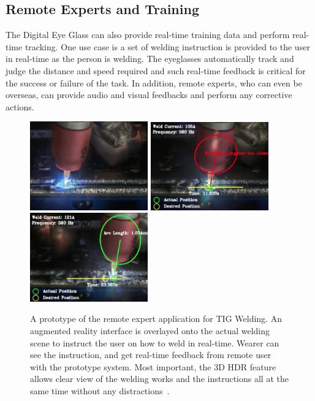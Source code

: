 \subsection{Remote Experts and Training}

The Digital Eye Glass can also provide real-time training data and perform real-time tracking. One 
use case is a set of welding instruction is provided to the user in real-time as the person is welding. 
The eyeglasses automatically track and judge the distance and speed required and such real-time 
feedback is critical for the success or failure of the task. In addition, remote experts, who can even be 
overseas, can provide audio and visual feedbacks and perform any corrective actions. 

\begin{figure}
\center
 \includegraphics[width=2in]{ch2/diagrams/remote1.jpg}
 \includegraphics[width=2in]{ch2/diagrams/remote3.jpg}
 \includegraphics[width=2in]{ch2/diagrams/remote2.jpg}
 \caption{A prototype of the remote expert application for TIG Welding. An augmented reality interface is 
overlayed onto the actual welding scene to instruct the user on how to weld in real-time. Wearer can see 
the instruction, and get real-time feedback from remote user with the prototype system. Most important, 
the 3D HDR feature allows clear view of the welding works and the instructions all at the same time 
without any distractions~\cite{mann2012hdrchitecture}.}
 \label{fig:extremeremote}
\end{figure}

